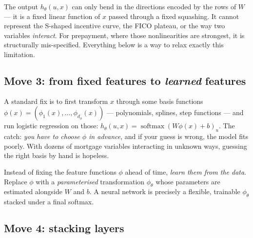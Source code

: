 \documentclass[11pt]{article}
\newcommand{\softmax}{\operatorname{softmax}}
\begin{document}
\begin{intuition}
The output $h_\theta(u,x)$ can only bend in the directions encoded by the rows of $W$ ---
it is a fixed linear function of $x$ passed through a fixed squashing. It cannot represent
the S-shaped incentive curve, the FICO plateau, or the way two variables \emph{interact}.
For prepayment, where those nonlinearities are strongest, it is structurally
mis-specified. Everything below is a way to relax exactly this limitation.
\end{intuition}

\subsection{Move 3: from fixed features to \emph{learned} features}

A standard fix is to first transform $x$ through some basis functions
$\phi(x) = (\phi_1(x),\dots,\phi_{d_\phi}(x))$ --- polynomials, splines, step functions ---
and run logistic regression on those:
\(
  h_\theta(u,x) = \softmax(W\phi(x) + b)_u .
\)
The catch: \emph{you have to choose $\phi$ in advance}, and if your guess is wrong, the
model fits poorly. With dozens of mortgage variables interacting in unknown ways, guessing
the right basis by hand is hopeless.

\begin{keyidea}
Instead of fixing the feature functions $\phi$ ahead of time, \emph{learn them from the
data}. Replace $\phi$ with a \emph{parameterised} transformation $\phi_\theta$ whose
parameters are estimated alongside $W$ and $b$. A neural network is precisely a flexible,
trainable $\phi_\theta$ stacked under a final softmax.
\end{keyidea}

\subsection{Move 4: stacking layers}
\end{document}
